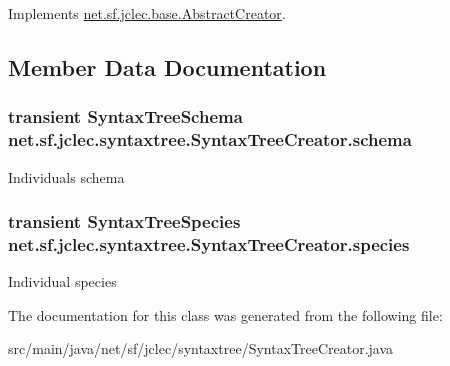 Implements \hyperlink{classnet_1_1sf_1_1jclec_1_1base_1_1_abstract_creator_a75beaef8489c52782e0c7c956c2beaf7}{net.\-sf.\-jclec.\-base.\-Abstract\-Creator}.



\subsection{Member Data Documentation}
\hypertarget{classnet_1_1sf_1_1jclec_1_1syntaxtree_1_1_syntax_tree_creator_a4c88f7d8dca98dac632b27082104b77f}{
\subsubsection[{schema}]{\setlength{\rightskip}{0pt plus 5cm}transient {\bf Syntax\-Tree\-Schema} net.\-sf.\-jclec.\-syntaxtree.\-Syntax\-Tree\-Creator.\-schema\hspace{0.3cm}{\ttfamily [protected]}}}\label{classnet_1_1sf_1_1jclec_1_1syntaxtree_1_1_syntax_tree_creator_a4c88f7d8dca98dac632b27082104b77f}
Individuals schema \hypertarget{classnet_1_1sf_1_1jclec_1_1syntaxtree_1_1_syntax_tree_creator_a5ca17f9dba1ce291abfd06d4f9bdf63c}{
\subsubsection[{species}]{\setlength{\rightskip}{0pt plus 5cm}transient {\bf Syntax\-Tree\-Species} net.\-sf.\-jclec.\-syntaxtree.\-Syntax\-Tree\-Creator.\-species\hspace{0.3cm}{\ttfamily [protected]}}}\label{classnet_1_1sf_1_1jclec_1_1syntaxtree_1_1_syntax_tree_creator_a5ca17f9dba1ce291abfd06d4f9bdf63c}
Individual species 

The documentation for this class was generated from the following file\-:\begin{DoxyCompactItemize}
\item 
src/main/java/net/sf/jclec/syntaxtree/Syntax\-Tree\-Creator.\-java\end{DoxyCompactItemize}
